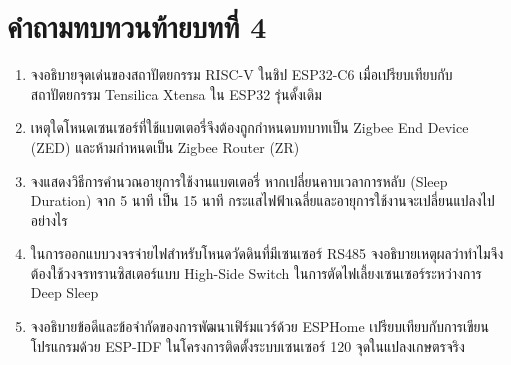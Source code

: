 \clearpage

\section*{คำถามทบทวนท้ายบทที่ 4}

\begin{enumerate}
    \item จงอธิบายจุดเด่นของสถาปัตยกรรม RISC-V ในชิป ESP32-C6 เมื่อเปรียบเทียบกับสถาปัตยกรรม Tensilica Xtensa ใน ESP32 รุ่นดั้งเดิม
    \item เหตุใดโหนดเซนเซอร์ที่ใช้แบตเตอรี่จึงต้องถูกกำหนดบทบาทเป็น Zigbee End Device (ZED) และห้ามกำหนดเป็น Zigbee Router (ZR)
    \item จงแสดงวิธีการคำนวณอายุการใช้งานแบตเตอรี่ หากเปลี่ยนคาบเวลาการหลับ (Sleep Duration) จาก 5 นาที เป็น 15 นาที กระแสไฟฟ้าเฉลี่ยและอายุการใช้งานจะเปลี่ยนแปลงไปอย่างไร
    \item ในการออกแบบวงจรจ่ายไฟสำหรับโหนดวัดดินที่มีเซนเซอร์ RS485 จงอธิบายเหตุผลว่าทำไมจึงต้องใช้วงจรทรานซิสเตอร์แบบ High-Side Switch ในการตัดไฟเลี้ยงเซนเซอร์ระหว่างการ Deep Sleep
    \item จงอธิบายข้อดีและข้อจำกัดของการพัฒนาเฟิร์มแวร์ด้วย ESPHome เปรียบเทียบกับการเขียนโปรแกรมด้วย ESP-IDF ในโครงการติดตั้งระบบเซนเซอร์ 120 จุดในแปลงเกษตรจริง
\end{enumerate}

\clearpage
